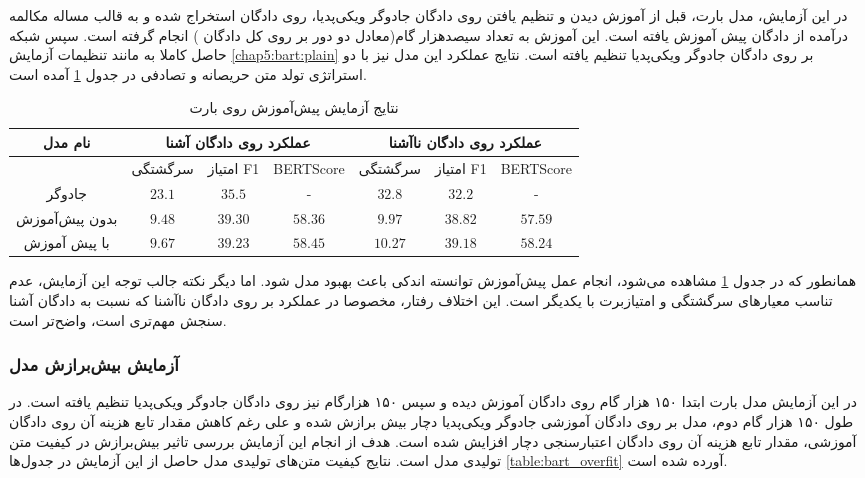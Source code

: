 در این آزمایش،‌ مدل بارت، قبل از آموزش دیدن و تنظیم یافتن روی دادگان جادوگر ویکی‌‌پدیا، روی دادگان استخراج شده و به قالب مساله مکالمه‌ درآمده از دادگان 
پیش آموزش یافته است. این آموزش به تعداد سیصدهزار گام(معادل دو دور بر روی کل دادگان 
)
انجام گرفته است. سپس شبکه حاصل کاملا به مانند تنظیمات آزمایش
\ref{chap5:bart:plain}
بر روی دادگان جادوگر ویکی‌پدیا تنظیم یافته است. نتایج عملکرد این مدل نیز با دو استراتژی تولد متن حریصانه و تصادفی در جدول 
\ref{table:bart_pretrain}
 آمده است.

\begin{table}[htb]
	\caption{نتایج آزمایش پیش‌آموزش روی بارت}
	\label{table:bart_pretrain}
	\begin{tabular}{|c|c|c|c|c|c|c|}
		\hline
		نام مدل        & \multicolumn{3}{c|}{عملکرد روی دادگان آشنا}           & \multicolumn{3}{c|}{عملکرد روی دادگان نا‌آشنا}        \\ \hline
		& سرگشتگی         & امتیاز F1        & BERTScore        & سرگشتگی         & امتیاز F1        & BERTScore        \\ \hline
		جادوگر         & $23.1$          & $35.5$           & -                & $32.8$          & $32.2$           & -                \\ \hline
		بدون پیش‌آموزش & $\mathbf{9.48}$ & $\mathbf{39.30}$ & $58.36$          & $\mathbf{9.97}$ & $38.82$          & $57.59$          \\ \hline
		با پیش آموزش   & $9.67$          & $39.23$          & $\mathbf{58.45}$ & $10.27$         & $\mathbf{39.18}$ & $\mathbf{58.24}$ \\ \hline
	\end{tabular}
\end{table}

همانطور که در جدول 
\ref{table:bart_pretrain}
مشاهده می‌شود، انجام عمل پیش‌آموزش توانسته اندکی باعث بهبود مدل شود. اما دیگر نکته جالب توجه این آزمایش، عدم تناسب معیارهای سرگشتگی و امتیازبرت با یکدیگر است. این اختلاف رفتار،‌ مخصوصا در عملکرد بر روی دادگان نا‌آشنا که نسبت به دادگان آشنا سنجش مهم‌تری است، واضح‌تر است.

\subsubsection{آزمایش بیش‌برازش مدل}
در این آزمایش مدل بارت ابتدا ۱۵۰ هزار گام روی دادگان
آموزش دیده و سپس ۱۵۰ هزارگام نیز روی دادگان جادوگر ویکی‌پدیا تنظیم یافته است. در طول ۱۵۰ هزار گام دوم، مدل بر روی دادگان آموزشی جادوگر ویکی‌پدیا دچار بیش برازش شده و علی رغم کاهش مقدار تابع هزینه آن روی دادگان آموزشی، مقدار تابع هزینه آن روی دادگان اعتبارسنجی دچار افزایش شده است. هدف از انجام این آزمایش بررسی تاثیر بیش‌برازش در کیفیت متن تولیدی مدل است. نتایج کیفیت متن‌های تولیدی مدل حاصل از این آزمایش در جدول‌ها
\ref{table:bart_overfit}
 آورده شده است. 

